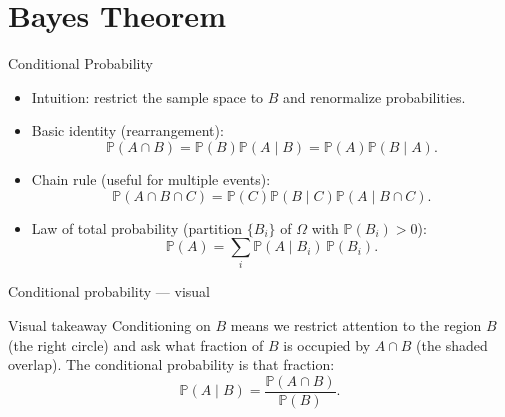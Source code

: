 \documentclass{beamer}
\renewcommand{\P}{\mathbb{P}}
\newcommand{\1}{\mathbf{1}}
\begin{document}
\section{Bayes Theorem}

\begin{frame}{Conditional Probability}
  \begin{itemize}
      \begin{block}{Definition}
        For two events $A$ and $B$ with $\P(B)>0$, the \emph{conditional probability} of $A$ given $B$ is defined as
        \[
          \P(A\mid B) = \frac{\P(A\cap B)}{\P(B)}.
        \]
      \end{block}
    \item Intuition: restrict the sample space to $B$ and renormalize probabilities.
    \item Basic identity (rearrangement):
      \[\P(A\cap B)=\P(B)\P(A\mid B)=\P(A)\P(B\mid A).\]
    \item Chain rule (useful for multiple events):
      \[\P(A\cap B\cap C)=\P(C)\P(B\mid C)\P(A\mid B\cap C).\]
    \item Law of total probability (partition $\{B_i\}$ of $\Omega$ with $\P(B_i)>0$):
      \[\P(A)=\sum_i\P(A\mid B_i)\,\P(B_i).\]
  \end{itemize}
\end{frame}

\begin{frame}{Conditional probability — visual}
  \centering

  \begin{exampleblock}{Visual takeaway}
    \small
    Conditioning on $B$ means we restrict attention to the region $B$ (the right circle) and ask what fraction
    of $B$ is occupied by $A\cap B$ (the shaded overlap). The conditional probability is that fraction:
    \[\P(A\mid B)=\dfrac{\P(A\cap B)}{\P(B)}.\]
  \end{exampleblock}
\end{frame}
\end{document}
